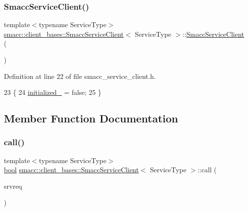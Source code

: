 \subsubsection{\texorpdfstring{Smacc\+Service\+Client()}{SmaccServiceClient()}}
{\footnotesize\ttfamily template$<$typename Service\+Type$>$ \\
\hyperlink{classsmacc_1_1client__bases_1_1SmaccServiceClient}{smacc\+::client\+\_\+bases\+::\+Smacc\+Service\+Client}$<$ Service\+Type $>$\+::\hyperlink{classsmacc_1_1client__bases_1_1SmaccServiceClient}{Smacc\+Service\+Client} (\begin{DoxyParamCaption}{ }\end{DoxyParamCaption})\hspace{0.3cm}{\ttfamily [inline]}}



Definition at line 22 of file smacc\+\_\+service\+\_\+client.\+h.


\begin{DoxyCode}
23     \{
24         \hyperlink{classsmacc_1_1client__bases_1_1SmaccServiceClient_ad36816c62fc14380a6d0782a2592a5b4}{initialized\_} = \textcolor{keyword}{false};
25     \}
\end{DoxyCode}


\subsection{Member Function Documentation}
\mbox{\label{classsmacc_1_1client__bases_1_1SmaccServiceClient_a0e9914f45f1091c38bb9ad6187d07977}} 
\subsubsection{\texorpdfstring{call()}{call()}}
{\footnotesize\ttfamily template$<$typename Service\+Type$>$ \\
\hyperlink{classbool}{bool} \hyperlink{classsmacc_1_1client__bases_1_1SmaccServiceClient}{smacc\+::client\+\_\+bases\+::\+Smacc\+Service\+Client}$<$ Service\+Type $>$\+::call (\begin{DoxyParamCaption}\item[{Service\+Type \&}]{srvreq }\end{DoxyParamCaption})\hspace{0.3cm}{\ttfamily [inline]}}



